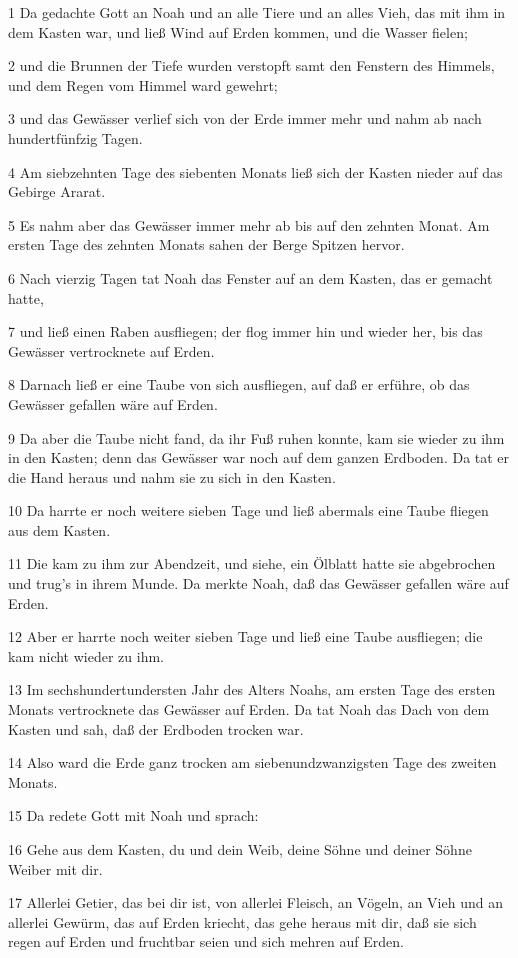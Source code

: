 \par 1 Da gedachte Gott an Noah und an alle Tiere und an alles Vieh, das mit ihm in dem Kasten war, und ließ Wind auf Erden kommen, und die Wasser fielen;
\par 2 und die Brunnen der Tiefe wurden verstopft samt den Fenstern des Himmels, und dem Regen vom Himmel ward gewehrt;
\par 3 und das Gewässer verlief sich von der Erde immer mehr und nahm ab nach hundertfünfzig Tagen.
\par 4 Am siebzehnten Tage des siebenten Monats ließ sich der Kasten nieder auf das Gebirge Ararat.
\par 5 Es nahm aber das Gewässer immer mehr ab bis auf den zehnten Monat. Am ersten Tage des zehnten Monats sahen der Berge Spitzen hervor.
\par 6 Nach vierzig Tagen tat Noah das Fenster auf an dem Kasten, das er gemacht hatte,
\par 7 und ließ einen Raben ausfliegen; der flog immer hin und wieder her, bis das Gewässer vertrocknete auf Erden.
\par 8 Darnach ließ er eine Taube von sich ausfliegen, auf daß er erführe, ob das Gewässer gefallen wäre auf Erden.
\par 9 Da aber die Taube nicht fand, da ihr Fuß ruhen konnte, kam sie wieder zu ihm in den Kasten; denn das Gewässer war noch auf dem ganzen Erdboden. Da tat er die Hand heraus und nahm sie zu sich in den Kasten.
\par 10 Da harrte er noch weitere sieben Tage und ließ abermals eine Taube fliegen aus dem Kasten.
\par 11 Die kam zu ihm zur Abendzeit, und siehe, ein Ölblatt hatte sie abgebrochen und trug's in ihrem Munde. Da merkte Noah, daß das Gewässer gefallen wäre auf Erden.
\par 12 Aber er harrte noch weiter sieben Tage und ließ eine Taube ausfliegen; die kam nicht wieder zu ihm.
\par 13 Im sechshundertundersten Jahr des Alters Noahs, am ersten Tage des ersten Monats vertrocknete das Gewässer auf Erden. Da tat Noah das Dach von dem Kasten und sah, daß der Erdboden trocken war.
\par 14 Also ward die Erde ganz trocken am siebenundzwanzigsten Tage des zweiten Monats.
\par 15 Da redete Gott mit Noah und sprach:
\par 16 Gehe aus dem Kasten, du und dein Weib, deine Söhne und deiner Söhne Weiber mit dir.
\par 17 Allerlei Getier, das bei dir ist, von allerlei Fleisch, an Vögeln, an Vieh und an allerlei Gewürm, das auf Erden kriecht, das gehe heraus mit dir, daß sie sich regen auf Erden und fruchtbar seien und sich mehren auf Erden.
